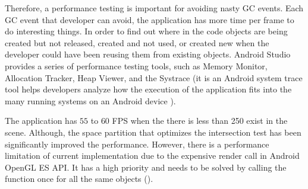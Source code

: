 Therefore, a performance testing is important for avoiding nasty GC events. Each GC event that developer can avoid, the application has more time per frame to do interesting things. In order to find out where in the code objects are being created but not released, created and not used, or created new when the developer could have been reusing them from existing objects. Android Studio provides a series of performance testing tools, such as Memory Monitor, Allocation Tracker, Heap Viewer, and the Systrace (it is an Android system trace tool helps developers analyze how the execution of the application fits into the many running systems on an Android device \cite{google.systrace.2016}).





The application has $55$ to $60$ FPS when the there is less than 250  exist in the scene. Although, the space partition that optimizes the intersection test has been significantly improved the performance. However, there is a performance limitation of current implementation due to the expensive render call in Android OpenGL ES API. It has a high priority and needs to be solved by calling the function once for all the same objects ().

